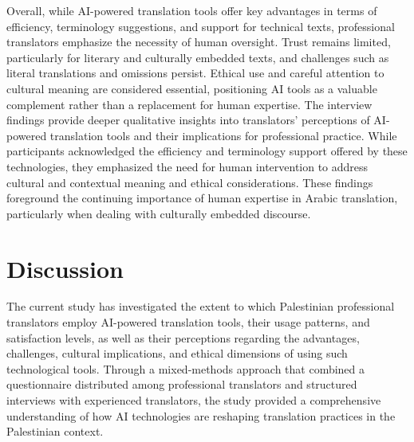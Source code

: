 \documentclass[english]{textolivre}
\begin{document}
\begin{enumerate}
    Overall, while AI-powered translation tools offer key advantages in terms of efficiency, terminology suggestions, and support for technical texts, professional translators emphasize the necessity of human oversight. Trust remains limited, particularly for literary and culturally embedded texts, and challenges such as literal translations and omissions persist. Ethical use and careful attention to cultural meaning are considered essential, positioning AI tools as a valuable complement rather than a replacement for human expertise. The interview findings provide deeper qualitative insights into translators’ perceptions of AI-powered translation tools and their implications for professional practice. While participants acknowledged the efficiency and terminology support offered by these technologies, they emphasized the need for human intervention to address cultural and contextual meaning and ethical considerations. These findings foreground the continuing importance of human expertise in Arabic translation, particularly when dealing with culturally embedded discourse.
\end{enumerate}


\section{Discussion}\label{sec-outras-estr}
The current study has investigated the extent to which Palestinian professional translators employ AI-powered translation tools, their usage patterns, and satisfaction levels, as well as their perceptions regarding the advantages, challenges, cultural implications, and ethical dimensions of using such technological tools. Through a mixed-methods approach that combined a questionnaire distributed among professional translators and structured interviews with experienced translators, the study provided a comprehensive understanding of how AI technologies are reshaping translation practices in the Palestinian context.
\end{document}
